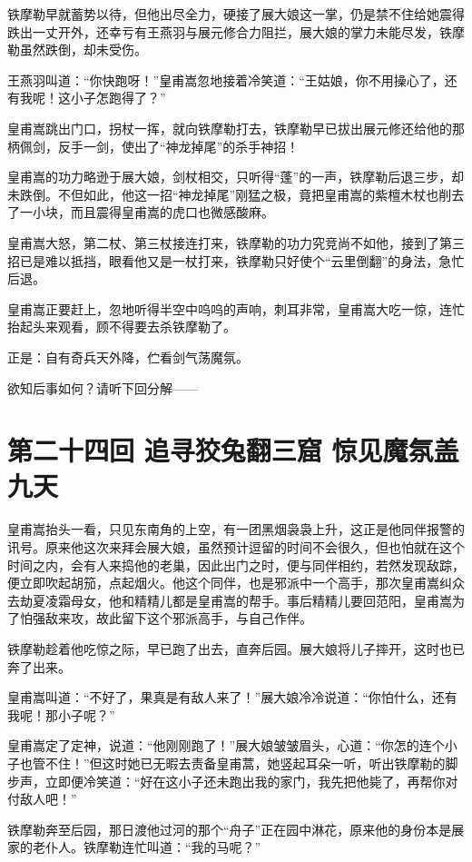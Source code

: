 \documentclass[12pt,oneside]{book}
\begin{document}
铁摩勒早就蓄势以待，但他出尽全力，硬接了展大娘这一掌，仍是禁不住给她震得跌出一丈开外，还幸亏有王燕羽与展元修合力阻拦，展大娘的掌力未能尽发，铁摩勒虽然跌倒，却未受伤。

王燕羽叫道：``你快跑呀！''皇甫嵩忽地接着冷笑道：``王姑娘，你不用操心了，还有我呢！这小子怎跑得了？''

皇甫嵩跳出门口，拐杖一挥，就向铁摩勒打去，铁摩勒早已拔出展元修还给他的那柄佩剑，反手一剑，使出了``神龙掉尾''的杀手神招！

皇甫嵩的功力略逊于展大娘，剑杖相交，只听得``蓬''的一声，铁摩勒后退三步，却未跌倒。不但如此，他这一招``神龙掉尾''刚猛之极，竟把皇甫嵩的紫檀木杖也削去了一小块，而且震得皇甫嵩的虎口也微感酸麻。

皇甫嵩大怒，第二杖、第三杖接连打来，铁摩勒的功力究竞尚不如他，接到了第三招已是难以抵挡，眼看他又是一杖打来，铁摩勒只好使个``云里倒翻''的身法，急忙后退。

皇甫嵩正要赶上，忽地听得半空中呜呜的声响，刺耳非常，皇甫嵩大吃一惊，连忙抬起头来观看，顾不得要去杀铁摩勒了。

正是：自有奇兵天外降，伫看剑气荡魔氛。

欲知后事如何？请听下回分解------

\chapter{第二十四回 追寻狡兔翻三窟
惊见魔氛盖九天}\label{ux7b2cux4e8cux5341ux56dbux56de-ux8ffdux5bfbux72e1ux5154ux7ffbux4e09ux7a9f-ux60caux89c1ux9b54ux6c1bux76d6ux4e5dux5929}

皇甫嵩抬头一看，只见东南角的上空，有一团黑烟袅袅上升，这正是他同伴报警的讯号。原来他这次来拜会展大娘，虽然预计逗留的时间不会很久，但也怕就在这个时间之内，会有人来捣他的老巢，因此出门之时，便与同伴相约，若然发现敌踪，便立即吹起胡笳，点起烟火。他这个同伴，也是邪派中一个高手，那次皇甫嵩纠众去劫夏凌霜母女，他和精精儿都是皇甫嵩的帮手。事后精精儿要回范阳，皇甫嵩为了怕强敌来攻，故此留下这个邪派高手，与自己作伴。

铁摩勒趁着他吃惊之际，早已跑了出去，直奔后园。展大娘将儿子摔开，这时也已奔了出来。

皇甫嵩叫道：``不好了，果真是有敌人来了！''展大娘冷冷说道：``你怕什么，还有我呢！那小子呢？''

皇甫嵩定了定神，说道：``他刚刚跑了！''展大娘皱皱眉头，心道：``你怎的连个小子也管不住！''但这时她已无暇去责备皇甫蒿，她竖起耳朵一听，听出铁摩勒的脚步声，立即便冷笑道：``好在这小子还未跑出我的家门，我先把他毙了，再帮你对付敌人吧！''

铁摩勒奔至后园，那日渡他过河的那个``舟子''正在园中淋花，原来他的身份本是展家的老仆人。铁摩勒连忙叫道：``我的马呢？''
\end{document}
